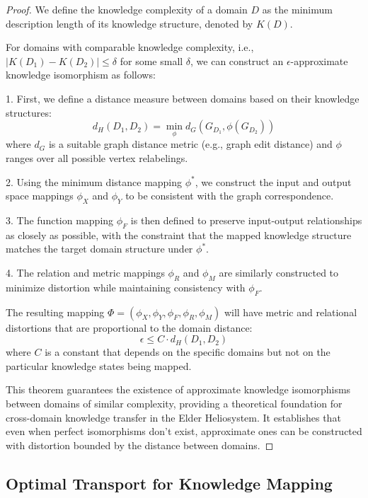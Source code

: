 \begin{proof}
We define the knowledge complexity of a domain $D$ as the minimum description length of its knowledge structure, denoted by $K(D)$.

For domains with comparable knowledge complexity, i.e., $|K(D_1) - K(D_2)| \leq \delta$ for some small $\delta$, we can construct an $\epsilon$-approximate knowledge isomorphism as follows:

1. First, we define a distance measure between domains based on their knowledge structures:
\begin{equation}
d_H(D_1, D_2) = \min_{\phi} d_G(G_{D_1}, \phi(G_{D_2}))
\end{equation}
where $d_G$ is a suitable graph distance metric (e.g., graph edit distance) and $\phi$ ranges over all possible vertex relabelings.

2. Using the minimum distance mapping $\phi^*$, we construct the input and output space mappings $\phi_X$ and $\phi_Y$ to be consistent with the graph correspondence.

3. The function mapping $\phi_F$ is then defined to preserve input-output relationships as closely as possible, with the constraint that the mapped knowledge structure matches the target domain structure under $\phi^*$.

4. The relation and metric mappings $\phi_R$ and $\phi_M$ are similarly constructed to minimize distortion while maintaining consistency with $\phi_F$.

The resulting mapping $\Phi = (\phi_X, \phi_Y, \phi_F, \phi_R, \phi_M)$ will have metric and relational distortions that are proportional to the domain distance:
\begin{equation}
\epsilon \leq C \cdot d_H(D_1, D_2)
\end{equation}
where $C$ is a constant that depends on the specific domains but not on the particular knowledge states being mapped.

This theorem guarantees the existence of approximate knowledge isomorphisms between domains of similar complexity, providing a theoretical foundation for cross-domain knowledge transfer in the Elder Heliosystem. It establishes that even when perfect isomorphisms don't exist, approximate ones can be constructed with distortion bounded by the distance between domains.
\end{proof}

\subsection{Optimal Transport for Knowledge Mapping}

